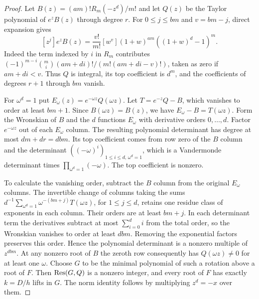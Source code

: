 \begin{proof}
Let \(B(z)=(am)!R_m(-z^d)/m!\) and let \(Q(z)\) be the Taylor
polynomial of \(e^z B(z)\) through degree \(r\). For \(0\le j\le bm\)
and \(v=bm-j\), direct expansion gives
\begin{equation}\label{eq:pade-coeff}
 [z^j]e^zB(z)=\frac{v!}{m!}
 [w^v](1+w)^{am}((1+w)^d-1)^m.
\end{equation}
Indeed the term indexed by \(i\) in \(R_m\) contributes
\((-1)^{m-i}\binom mi(am+di)!/(m!(am+di-v)!)\),
taken as zero if \(am+di<v\). Thus \(Q\) is integral, its top
coefficient is \(d^m\), and the coefficients of degrees \(r+1\)
through \(bm\) vanish.

For \(\omega^d=1\) put \(E_\omega(z)=e^{-\omega z}Q(\omega z)\).
Let \(T=e^{-z}Q-B\), which vanishes to order at least \(bm+1\).
Since \(B(\omega z)=B(z)\), we have \(E_\omega-B=T(\omega z)\).
Form the Wronskian of \(B\) and the \(d\) functions \(E_\omega\)
with derivative orders \(0,\ldots,d\). Factor \(e^{-\omega z}\)
out of each \(E_\omega\) column. The resulting polynomial
determinant has degree at most \(dm+dr=dbm\).
Its top coefficient comes from row zero of the \(B\) column
and the determinant \(((-\omega)^i)_{1\le i\le d,\,\omega^d=1}\),
which is a Vandermonde determinant times
\(\prod_{\omega^d=1}(-\omega)\). The top coefficient is nonzero.

To calculate the vanishing order, subtract the \(B\) column
from the original \(E_\omega\) columns. The invertible
change of columns taking the sums
\(d^{-1}\sum_{\omega^d=1}\omega^{-(bm+j)}T(\omega z)\),
for \(1\le j\le d\), retains one residue class of exponents in
each column. Their orders are at least \(bm+j\).
In each determinant term the derivatives subtract at most
\(\sum_{i=0}^d i\) from the total order, so the Wronskian vanishes
to order at least \(dbm\). Removing the exponential factors
preserves this order. Hence the polynomial determinant is a
nonzero multiple of \(z^{dbm}\). At any nonzero
root of \(B\) the zeroth row consequently has
\(Q(\omega z)\ne0\) for at least one \(\omega\).
Choose \(G\) to be the minimal polynomial of such a rotation
above a root of \(F\). Then \(\operatorname{Res}(G,Q)\) is a nonzero integer,
and every root of \(F\) has exactly \(k=D/h\) lifts in \(G\).
The norm identity follows by multiplying \(z^d=-x\) over them.


\end{proof}
